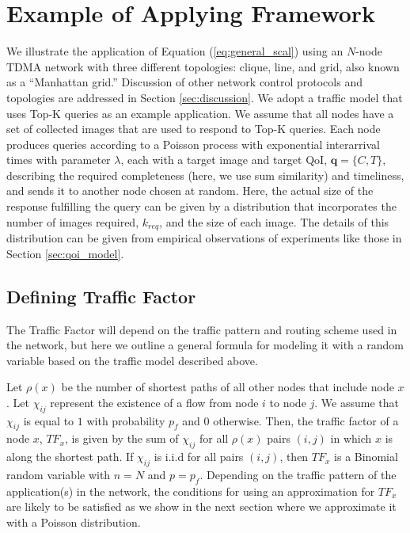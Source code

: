 \section{Example of Applying Framework}
\label{sec:example_applications}

We illustrate the application of Equation (\ref{eq:general_scal}) using an $N$-node TDMA network with three different topologies: clique, line, and grid, also known as a ``Manhattan grid.''  Discussion of other network control protocols and topologies are addressed in Section \ref{sec:discussion}.  We adopt a traffic model that uses Top-K queries as an example application.  We assume that all nodes have a set of collected images that are used to respond to Top-K queries.  Each node produces queries according to a Poisson process with exponential interarrival times with parameter $\lambda$, each with a target image and target QoI, $\mathbf{q} = \{C, T\}$, describing the required completeness (here, we use sum similarity) and timeliness, and sends it to another node chosen at random.  
Here, the actual size of the response fulfilling the query can be given by a distribution that incorporates the number of images required, $k_{req}$, and the size of each image.  The details of this distribution can be given from empirical observations of experiments like those in Section \ref{sec:qoi_model}.

\subsection{Defining Traffic Factor}
\label{sec:def_tf}

The Traffic Factor will depend on the traffic pattern and routing scheme used in the network, but here we outline a general formula for modeling it with a random variable based on the traffic model described above.  

Let $\rho(x)$ be the number of shortest paths of all other nodes that include node $x$.  Let $\chi_{ij}$ represent the existence of a flow from node $i$ to node $j$.  We assume that $\chi_{ij}$ is equal to $1$ with probability $p_{f}$ and $0$ otherwise.  Then, the traffic factor of a node $x$, $TF_x$, is given by the sum of $\chi_{ij}$ for all $\rho(x)$ pairs $(i,j)$ in which $x$ is along the shortest path.  If $\chi_{ij}$ is i.i.d for all pairs $(i,j)$, then $TF_x$ is a Binomial random variable with $n=N$ and $p=p_{f}$.  Depending on the traffic pattern of the application(s) in the network, the conditions for using an approximation for $TF_x$ are likely to be satisfied as we show in the next section where we approximate it with a Poisson distribution.

